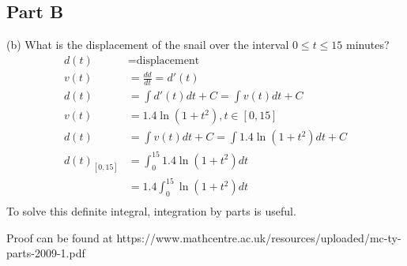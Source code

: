 \documentclass{article}
\begin{document}
\newpage
\subsection{Part B}
(b) What is the displacement of the snail over the interval $0\leq t\leq 15$ minutes?
\begin{align*}
d(t) &= \text{displacement} \\
v(t) &= \frac{dd}{dt} = d'(t)\\
d(t) &= \int d'(t)dt + C = \int v(t)dt + C\\
v(t) &= 1.4\ln(1+t^2), t\in [0,15]\\
d(t) &= \int v(t)dt + C = \int 1.4\ln(1+t^2)dt + C\\
d(t)_{[0,15]} &= \int_0^{15} 1.4\ln(1+t^2)dt\\
&= 1.4 \int_0^{15} \ln(1+t^2)dt\\
\end{align*}
To solve this definite integral, integration by parts is useful.

    Proof can be found at https://www.mathcentre.ac.uk/resources/uploaded/mc-ty-parts-2009-1.pdf
\end{document}
